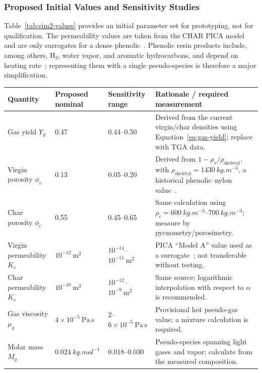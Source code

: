 \documentclass[oneside,openany]{amsdtx}
\begin{document}
\subsubsection{Proposed Initial Values and Sensitivity Studies}

Table~\ref{tab:sim2-values} provides an initial parameter set for prototyping,
not for qualification. The permeability values are taken from the CHAR PICA
model and are only surrogates for a dense phenolic~\cite{amar2016}. Phenolic
resin products include, among others, \(\mathrm{H_2}\), water vapor, and aromatic
hydrocarbons, and depend on heating rate~\cite{bessire2023}; representing them
with a single pseudo-species is therefore a major simplification.

\begin{table}[H]
\centering
\scriptsize
\renewcommand{\arraystretch}{1.18}
\begin{tabular}{L{0.18\textwidth}M{0.16\textwidth}M{0.18\textwidth}L{0.38\textwidth}}
\toprule
\textbf{Quantity} & \textbf{Proposed nominal} & \textbf{Sensitivity range} & \textbf{Rationale / required measurement} \\
\midrule
Gas yield \(Y_g\) & 0.47 & 0.44--0.50 & Derived from the current virgin/char densities using Equation~\eqref{eq:gas-yield}; replace with TGA data. \\
Virgin porosity \(\phi_v\) & 0.13 & 0.05--0.20 & Derived from \(1-\rho_v/\rho_\mathrm{skeletal}\), with \(\rho_\mathrm{skeletal}=\SI{1430}{kg.m^{-3}}\), a historical phenolic--nylon value~\cite{clark1972}. \\
Char porosity \(\phi_c\) & 0.55 & 0.45--0.65 & Same calculation using \(\rho_c=\SIrange{600}{700}{kg.m^{-3}}\); measure by pycnometry/porosimetry. \\
Virgin permeability \(K_v\) & \(10^{-12}\ \mathrm{m^2}\) & \(10^{-14}\)--\(10^{-11}\ \mathrm{m^2}\) & PICA ``Model A'' value used as a surrogate~\cite{amar2016}; not transferable without testing. \\
Char permeability \(K_c\) & \(10^{-10}\ \mathrm{m^2}\) & \(10^{-12}\)--\(10^{-9}\ \mathrm{m^2}\) & Same source; logarithmic interpolation with respect to \(\alpha\) is recommended. \\
Gas viscosity \(\mu_g\) & \(4\times10^{-5}\ \mathrm{Pa\,s}\) & \(2\)--\(6\times10^{-5}\ \mathrm{Pa\,s}\) & Provisional hot pseudo-gas value; a mixture calculation is required. \\
Molar mass \(M_g\) & \(\SI{0.024}{kg.mol^{-1}}\) & 0.018--0.030 & Pseudo-species spanning light gases and vapor; calculate from the measured composition. \\

\end{tabular}
\end{table}
\end{document}
